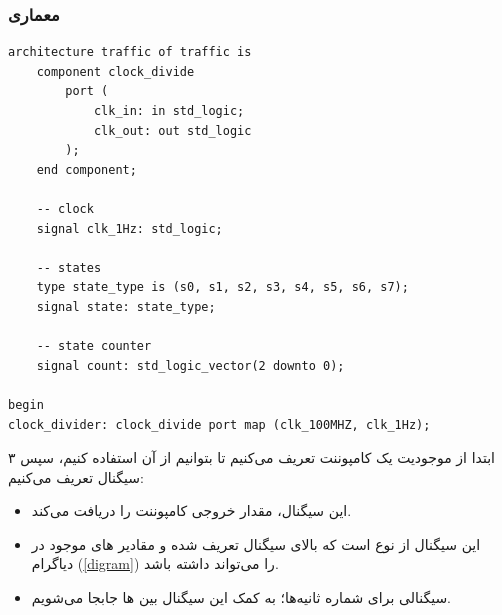 \documentclass[dvipsnames, svgnames, x11names, a4paper, 11pt]{article}
\begin{document}
\subsubsection{معماری}
\begin{latin}
\begin{lstlisting}[firstnumber=12]
architecture traffic of traffic is
    component clock_divide
        port (
            clk_in: in std_logic;
            clk_out: out std_logic
        );
	end component;

    -- clock
    signal clk_1Hz: std_logic;

    -- states
    type state_type is (s0, s1, s2, s3, s4, s5, s6, s7);
    signal state: state_type;

    -- state counter
    signal count: std_logic_vector(2 downto 0);

begin
clock_divider: clock_divide port map (clk_100MHZ, clk_1Hz);
\end{lstlisting}
\end{latin}
ابتدا
از موجودیت 
یک کامپوننت تعریف می‌کنیم تا بتوانیم از آن استفاده کنیم، سپس ۳ سیگنال تعریف می‌کنیم:
\begin{itemize}
\item {}

این سیگنال، مقدار خروجی کامپوننت 
را دریافت می‌کند.

\item {}

این سیگنال از نوع 
است که بالای سیگنال تعریف شده و مقادیر 
های
موجود در دیاگرام (\ref{digram}) را می‌تواند داشته باشد.

\item {}

سیگنالی برای شماره ثانیه‌ها؛ به کمک این سیگنال بین 
ها
جابجا می‌شویم.
\end{itemize}

\newpage
\end{document}
